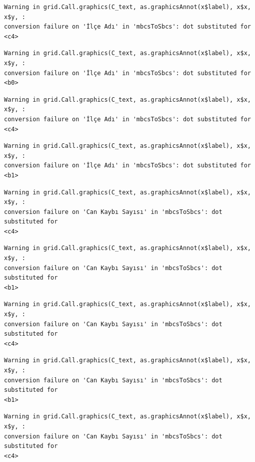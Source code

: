 \documentclass[
  11pt,
  a4paper,
  DIV=11,
  numbers=noendperiod]{scrartcl}
\begin{document}
\begin{verbatim}
Warning in grid.Call.graphics(C_text, as.graphicsAnnot(x$label), x$x, x$y, :
conversion failure on 'İlçe Adı' in 'mbcsToSbcs': dot substituted for <c4>
\end{verbatim}

\begin{verbatim}
Warning in grid.Call.graphics(C_text, as.graphicsAnnot(x$label), x$x, x$y, :
conversion failure on 'İlçe Adı' in 'mbcsToSbcs': dot substituted for <b0>
\end{verbatim}

\begin{verbatim}
Warning in grid.Call.graphics(C_text, as.graphicsAnnot(x$label), x$x, x$y, :
conversion failure on 'İlçe Adı' in 'mbcsToSbcs': dot substituted for <c4>
\end{verbatim}

\begin{verbatim}
Warning in grid.Call.graphics(C_text, as.graphicsAnnot(x$label), x$x, x$y, :
conversion failure on 'İlçe Adı' in 'mbcsToSbcs': dot substituted for <b1>
\end{verbatim}

\begin{verbatim}
Warning in grid.Call.graphics(C_text, as.graphicsAnnot(x$label), x$x, x$y, :
conversion failure on 'Can Kaybı Sayısı' in 'mbcsToSbcs': dot substituted for
<c4>
\end{verbatim}

\begin{verbatim}
Warning in grid.Call.graphics(C_text, as.graphicsAnnot(x$label), x$x, x$y, :
conversion failure on 'Can Kaybı Sayısı' in 'mbcsToSbcs': dot substituted for
<b1>
\end{verbatim}

\begin{verbatim}
Warning in grid.Call.graphics(C_text, as.graphicsAnnot(x$label), x$x, x$y, :
conversion failure on 'Can Kaybı Sayısı' in 'mbcsToSbcs': dot substituted for
<c4>
\end{verbatim}

\begin{verbatim}
Warning in grid.Call.graphics(C_text, as.graphicsAnnot(x$label), x$x, x$y, :
conversion failure on 'Can Kaybı Sayısı' in 'mbcsToSbcs': dot substituted for
<b1>
\end{verbatim}

\begin{verbatim}
Warning in grid.Call.graphics(C_text, as.graphicsAnnot(x$label), x$x, x$y, :
conversion failure on 'Can Kaybı Sayısı' in 'mbcsToSbcs': dot substituted for
<c4>
\end{verbatim}
\end{document}
